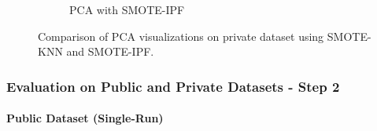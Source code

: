 \documentclass[conference]{IEEEtran}
\begin{document}
\begin{figure}[H]
\begin{subfigure}[b]{0.48\linewidth}
        \caption{PCA with SMOTE-IPF}
        \label{fig:pca-smote-ipf}
    \end{subfigure}
    \caption{Comparison of PCA visualizations on private dataset using SMOTE-KNN and SMOTE-IPF.}
    \label{fig:pca-comparison}
\end{figure}

\subsubsection{Evaluation on Public and Private Datasets - Step 2}
\paragraph{Public Dataset (Single-Run)}\mbox{}\\
\onecolumn
\begin{table}[H]
\centering
\caption{Single-run performance of baseline models on the public dataset}
\label{tab:single-run-public}
\end{table} 
\end{document}
